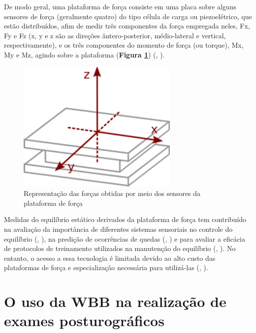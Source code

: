 De modo geral, uma plataforma de força consiste em uma placa sobre alguns sensores de força (geralmente quatro) do tipo célula de carga ou piezoelétrico, que estão distribuídos, afim de medir três componentes da força empregada neles, Fx, Fy e Fz (x, y e z são as direções ântero-posterior, médio-lateral e vertical, respectivamente), e os três componentes do momento de força (ou torque), Mx, My e Mz, agindo sobre a plataforma (\textbf{Figura \ref{PF}}) (\citeauthor{duarte2010revision}, \citeyear{duarte2010revision}).

\begin{figure}
\captionsetup{justification   = raggedright,
              singlelinecheck = false}
\caption{Representação das forças obtidas por meio dos sensores
da plataforma de força}\label{PF}
\includegraphics[width=0.7\textwidth]{figs/PF1.png}
\end{figure}

Medidas do equilíbrio estático derivados da plataforma de força tem contribuído na avaliação da importância de diferentes sistemas sensoriais no controle do equilíbrio (\citeauthor{shumway1986assessing}, \citeyear{shumway1986assessing}), na predição de ocorrências de quedas (\citeauthor{pajala2008force}, \citeyear{pajala2008force}) e para avaliar a eficácia de protocolos de treinamento utilizados na manutenção do equilíbrio (\citeauthor{bonan2004reliance}, \citeyear{bonan2004reliance}). No entanto, o acesso a essa tecnologia é limitada devido ao alto custo das plataformas de força e especialização necessária para utilizá-las (\citeauthor{visser2008clinical}, \citeyear{visser2008clinical}).


\section{O uso da WBB na realização de exames posturográficos}\label{UsoDaWBB}

